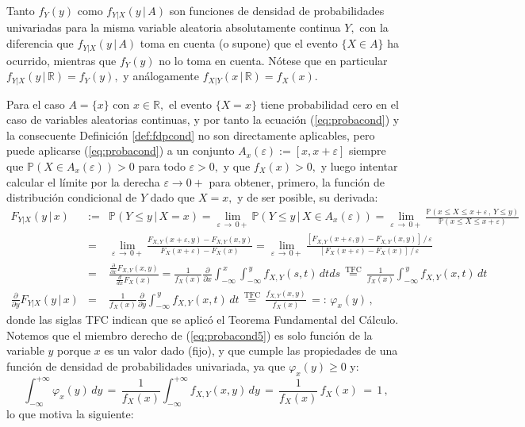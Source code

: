 \documentclass[spanish,10pt,letterpaper]{article}
\newcommand{\prob}{\mathbb{P}}
\newcommand{\Runo}{\mathbb{R}}
\begin{document}
Tanto $f_Y(y)$ como $f_{Y|X}(y\,|\,A)$ son funciones de densidad de probabilidades univariadas para la misma variable aleatoria absolutamente continua $Y,$ con la diferencia que $f_{Y|X}(y\,|\,A)$ toma en cuenta (o supone) que el evento $\{X\in A\}$ ha ocurrido, mientras que $f_Y(y)$ no lo toma en cuenta. Nótese que en particular $f_{Y|X}(y\,|\,\Runo)=f_Y(y),$ y análogamente $f_{X|Y}(x\,|\,\Runo)=f_X(x).$

\medskip 

Para el caso $A=\{x\}$ con $x\in\Runo,$ el evento $\{X=x\}$ tiene probabilidad cero en el caso de variables aleatorias continuas, y por tanto la ecuación (\ref{eq:probacond}) y la consecuente Definición \ref{def:fdpcond} no son directamente aplicables, pero puede aplicarse (\ref{eq:probacond}) a un conjunto $A_x(\varepsilon):=[x,x+\varepsilon]$ siempre que $\prob(X\in A_x(\varepsilon))>0$ para todo $\varepsilon>0,$ y que $f_X(x)>0,$ y luego intentar calcular el límite por la derecha $\varepsilon\rightarrow0+$ para obtener, primero, la función de distribución condicional de $Y$ dado que $X=x,$ y de ser posible, su derivada:
\begin{eqnarray}\label{eq:probacond5}
    F_{Y|X}(y\,|\,x) &:=& \prob(Y\leq y\,|\,X=x) = \lim_{\varepsilon\,\rightarrow\,0+}\prob(Y\leq y\,|\,X\in A_x(\varepsilon)) = \lim_{\varepsilon\,\rightarrow\,0+}\frac{\prob(x\leq X\leq x+\varepsilon\,,\,Y\leq y)}{\prob(x\leq X\leq x+\varepsilon)} \nonumber \\
    &=& \lim_{\varepsilon\,\rightarrow\,0+}\frac{F_{X,Y}(x+\varepsilon,y) - F_{X,Y}(x,y)}{F_X(x+\varepsilon) - F_X(x)} = \lim_{\varepsilon\,\rightarrow\,0+}\frac{[F_{X,Y}(x+\varepsilon,y) - F_{X,Y}(x,y)]\,/\,\varepsilon}{[F_X(x+\varepsilon) - F_X(x)]\,/\,\varepsilon} \nonumber \\ 
    &=& \frac{\frac{\partial}{\partial x}F_{X,Y}(x,y)}{\frac{d}{dx}F_X(x)} = \frac{1}{f_X(x)}\frac{\partial}{\partial x}\int_{-\infty}^{\,x}\int_{-\infty}^{\,y}f_{X,Y}(s,t)\,dtds \,\stackrel{\text{TFC}}{=}\, \frac{1}{f_X(x)}\int_{-\infty}^{\,y}f_{X,Y}(x,t)\,dt \nonumber \\ 
    \frac{\partial}{\partial y}F_{Y|X}(y\,|\,x) &=&  \frac{1}{f_X(x)}\frac{\partial}{\partial y}\int_{-\infty}^{\,y}f_{X,Y}(x,t)\,dt \,\stackrel{\text{TFC}}{=}\, \frac{f_{X,Y}(x,y)}{f_X(x)} \,=:\, \varphi_x(y)\,,
\end{eqnarray}
donde las siglas TFC indican que se aplicó el Teorema Fundamental del Cálculo. Notemos que el miembro derecho de (\ref{eq:probacond5}) es solo función de la variable $y$ porque $x$ es un valor dado (fijo), y que cumple las propiedades de una función de densidad de probabilidades univariada, ya que $\varphi_x(y)\geq 0$ y:
$$\int_{-\infty}^{+\infty}\varphi_x(y)\,dy \,=\, \frac{1}{f_X(x)}\int_{-\infty}^{+\infty}f_{X,Y}(x,y)\,dy \,=\, \frac{1}{f_X(x)}\,f_X(x) \,=\, 1\,,$$
lo que motiva la siguiente:
\end{document}
